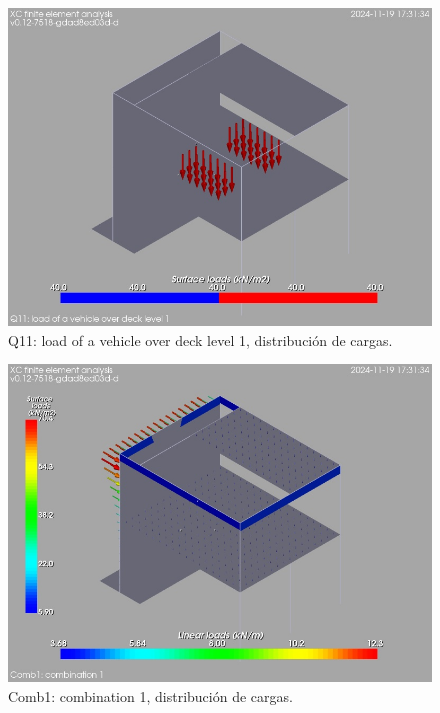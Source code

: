\begin{figure}[ht]
\begin{center}
\includegraphics[width=\linewidth]{results/graphics/loads/QvehicleDeck1overallSet}
\caption{Q11: load of a vehicle over deck level 1, distribución de cargas.}
\label{QvehicleDeck1overallSet}
\end{center}
\end{figure}
\begin{figure}[ht]
\begin{center}
\includegraphics[width=\linewidth]{results/graphics/loads/LS1overallSet}
\caption{Comb1: combination 1, distribución de cargas.}
\label{LS1overallSet}
\end{center}
\end{figure}

